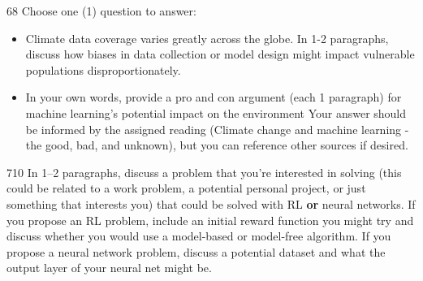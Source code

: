 \documentclass[11pt]{article}
\begin{document}
\begin{studentanswer}[30]
\end{studentanswer}


\newpage


\begin{problem}{6}{8}
Choose one (1) question to answer:

\begin{itemize}
    \item Climate data coverage varies greatly across the globe. In 1-2 paragraphs, discuss how biases in data collection or model design might impact vulnerable populations disproportionately.
    \item In your own words, provide a pro and con argument (each 1 paragraph) for machine learning's potential impact on the environment Your answer should be informed by the assigned reading (Climate change and machine learning - the good, bad, and unknown), but you can reference other sources if desired.
\end{itemize}

\end{problem}

\begin{studentanswer}[30]
\end{studentanswer}



\begin{problem}{7}{10}
In 1--2 paragraphs, discuss a problem that you’re interested in solving (this could be related to a work problem, a potential personal project, or just something that interests you) that could be solved with RL \textbf{or} neural networks. If you propose an RL problem, include an initial reward function you might try and discuss whether you would use a model-based or model-free algorithm. If you propose a neural network problem, discuss a potential dataset and what the output layer of your neural net might be.
\end{problem}

\begin{studentanswer}[20]
\end{studentanswer}



\end{document}
